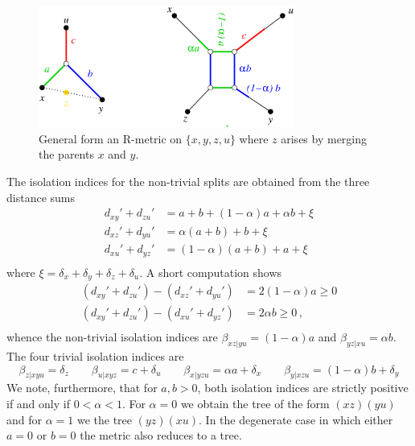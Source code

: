 \documentclass{article}
\begin{document}
\begin{figure}
  \begin{center}
    \includegraphics[width=0.75\textwidth]{n4.eps}
  \end{center}
  \caption{General form an R-metric on $\{x,y,z,u\}$ where $z$ arises by
    merging the parents $x$ and $y$.}
  \label{fig:4box}
\end{figure}

The isolation indices for the non-trivial splits are
obtained from the three distance sums
\begin{equation*}
  \begin{split}
    d_{xy}'+d_{zu}' & =  a + b + (1-\alpha)a + \alpha b + \xi \\
    d_{xz}'+d_{yu}' & = \alpha (a+b) + b + \xi \\
    d_{xu}'+d_{yz}' & = (1-\alpha)(a+b) + a + \xi \\
  \end{split}
\end{equation*}
where $\xi=\delta_x+\delta_y+\delta_z+\delta_u$. A short computation shows
\begin{equation*}
  \begin{split}
    (d_{xy}'+d_{zu}')-(d_{xz}'+d_{yu}') &= 2(1-\alpha)a \ge 0 \\
    (d_{xy}'+d_{zu}')-(d_{xu}'+d_{yz}') &= 2\alpha b \ge 0 \,,\\
  \end{split}
\end{equation*}
whence the non-trivial isolation indices are $\beta_{xz|yu}=(1-\alpha)a$
and $\beta_{yz|xu}=\alpha b$. The four trivial isolation indices are
\begin{equation*}
  \beta_{z|xyu} = \delta_z \qquad
  \beta_{u|xyz} = c + \delta_u \qquad
  \beta_{x|yzu} = \alpha a + \delta_x \qquad
  \beta_{y|xzu} = (1-\alpha) b + \delta_y 
\end{equation*}
We note, furthermore, that for $a,b>0$, both isolation indices are strictly
positive if and only if $0<\alpha<1$. For $\alpha=0$ we obtain the tree of
the form $(xz)(yu)$ and for $\alpha=1$ we the tree $(yz)(xu)$. In the
degenerate case in which either $a=0$ or $b=0$ the metric also reduces to a
tree. 
\end{document}
